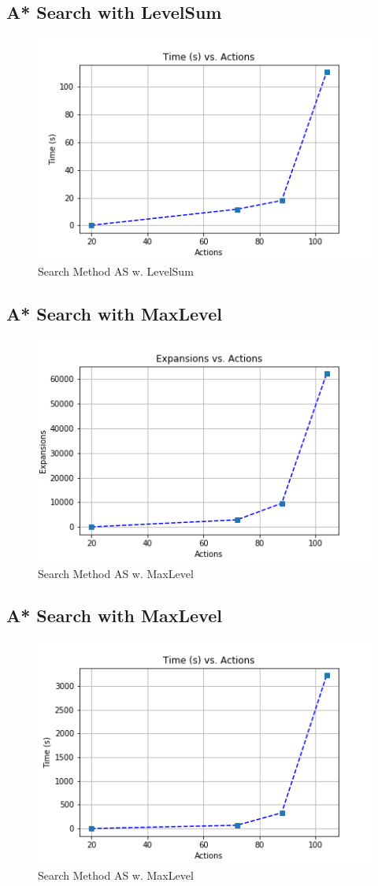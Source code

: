 \documentclass[a4paper]{article}
\begin{document}
\subsection{A* Search with LevelSum}

\begin{figure}[htpb]
\begin{center}
\includegraphics[width=0.5\columnwidth]{fig/results_731.png}
\caption{Search Method AS w. LevelSum}
\end{center}
\label{fig731}
\end{figure}
        

\subsection{A* Search with MaxLevel}

\begin{figure}[htpb]
\begin{center}
\includegraphics[width=0.5\columnwidth]{fig/results_834.png}
\caption{Search Method AS w. MaxLevel}
\end{center}
\label{fig834}
\end{figure}
        

\subsection{A* Search with MaxLevel}

\begin{figure}[htpb]
\begin{center}
\includegraphics[width=0.5\columnwidth]{fig/results_831.png}
\caption{Search Method AS w. MaxLevel}
\end{center}
\label{fig831}
\end{figure}
        
\end{document}
